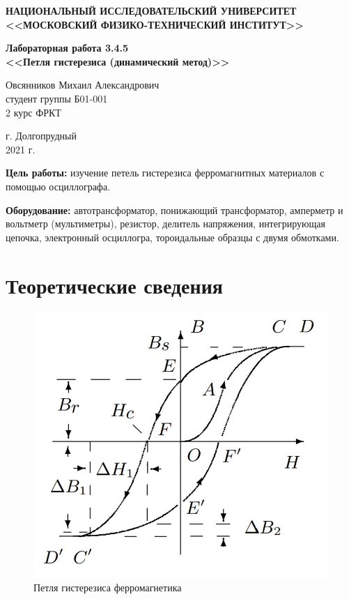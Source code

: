 \documentclass[a4paper,12pt]{article} %
\begin{document}
	\begin{center}
		
		\textbf{НАЦИОНАЛЬНЫЙ ИССЛЕДОВАТЕЛЬСКИЙ УНИВЕРСИТЕТ \\ <<МОСКОВСКИЙ ФИЗИКО-ТЕХНИЧЕСКИЙ ИНСТИТУТ>>}
		\vspace{13ex}
		
		\textbf{Лабораторная работа 3.4.5 \\ <<Петля гистерезиса (динамический метод)>> }
		\vspace{60ex}
		
		\normalsize{Овсянников Михаил Александрович \\ студент группы Б01-001\\ 2 курс ФРКТ\\}
	\end{center}
	
	\vfill 
	
	\begin{center}
		г. Долгопрудный\\ 
		2021 г.
	\end{center}
	
	\thispagestyle{empty} %
	
	\newpage
	
	\textbf{Цель работы:} изучение петель гистерезиса ферромагнитных материалов с помощью осциллографа.
	
	\vspace{7mm}
	\textbf{Оборудование:} автотрансформатор, понижающий трансформатор, амперметр и вольтметр (мультиметры), резистор, делитель напряжения, интегрирующая
	цепочка, электронный осциллогра, тороидальные образцы с двумя обмотками.
	
	
	\section*{Теоретические сведения}
	
	\begin{figure}
		\vspace{-20pt}
		\begin{center}
			\includegraphics[width=0.7\linewidth]{Pictures/Loop.jpeg}
		\end{center}
		\vspace{-10pt}
		\caption{Петля гистерезиса ферромагнетика}
	\end{figure}
	
\end{document}
